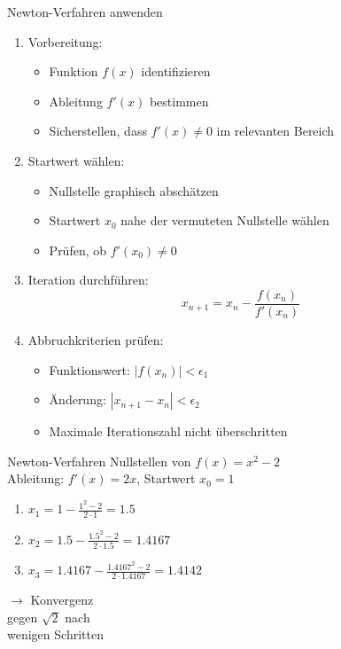 \begin{KR}{Newton-Verfahren anwenden}
\begin{enumerate}
    \item Vorbereitung:
    \begin{itemize}
        \item Funktion $f(x)$ identifizieren
        \item Ableitung $f'(x)$ bestimmen
        \item Sicherstellen, dass $f'(x) \neq 0$ im relevanten Bereich
    \end{itemize}
    \item Startwert wählen:
    \begin{itemize}
        \item Nullstelle graphisch abschätzen
        \item Startwert $x_0$ nahe der vermuteten Nullstelle wählen
        \item Prüfen, ob $f'(x_0) \neq 0$
    \end{itemize}
    \item Iteration durchführen:
    $$x_{n+1} = x_n - \frac{f(x_n)}{f'(x_n)}$$
    \item Abbruchkriterien prüfen:
    \begin{itemize}
        \item Funktionswert: $|f(x_n)| < \epsilon_1$
        \item Änderung: $|x_{n+1}-x_n| < \epsilon_2$
        \item Maximale Iterationszahl nicht überschritten
    \end{itemize}
\end{enumerate}
\end{KR}

\begin{example2}{Newton-Verfahren} Nullstellen von $f(x)=x^2-2$\\
Ableitung: $f'(x) = 2x$, Startwert $x_0 = 1$
\vspace{1mm}\\
\begin{minipage}[t]{0.65\textwidth}
    \vspace{-3mm}
    \begin{enumerate}
        \item $x_1 = 1 - \frac{1^2-2}{2 \cdot 1} = 1.5$
        \item $x_2 = 1.5 - \frac{1.5^2-2}{2 \cdot 1.5} = 1.4167$
        \item $x_3 = 1.4167 - \frac{1.4167^2-2}{2 \cdot 1.4167} = 1.4142$
    \end{enumerate}
\end{minipage}
\begin{minipage}[t]{0.3\textwidth}
    $\rightarrow$ Konvergenz \\ gegen $\sqrt{2}$ nach \\ wenigen Schritten
\end{minipage}
\end{example2}

